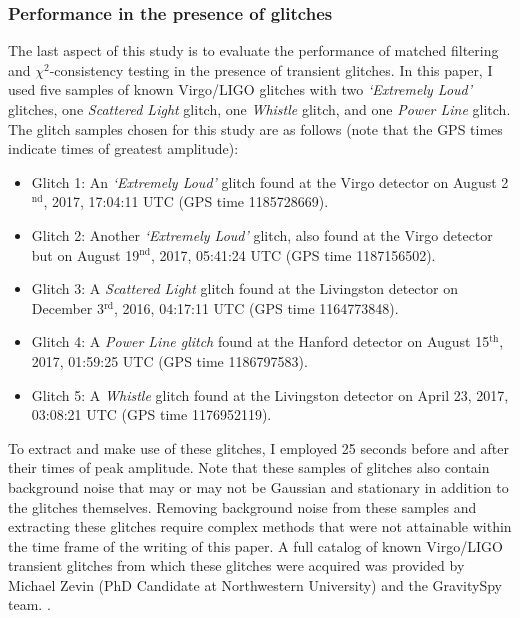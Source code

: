 \documentclass[preprint,
letterpaper,
 amsmath,amssymb,
 aps,
]{revtex4-2}
\begin{document}
\subsubsection{Performance in the presence of glitches}

The last aspect of this study is to evaluate the performance of matched filtering and $\chi^2$-consistency testing in the presence of transient glitches. In this paper, I used five samples of known Virgo/LIGO glitches with two \textit{`Extremely Loud'} glitches, one \textit{Scattered Light} glitch, one \textit{Whistle} glitch, and one \textit{Power Line} glitch. The glitch samples chosen for this study are as follows (note that the GPS times indicate times of greatest amplitude):

\begin{itemize}
\item Glitch 1: An \textit{`Extremely Loud'} glitch found at the Virgo detector on August 2$^{\text{nd}}$, 2017, 17:04:11 UTC (GPS time 1185728669).

\item Glitch 2: Another \textit{`Extremely Loud'} glitch, also found at the Virgo detector but on August 19$^{\text{nd}}$, 2017, 05:41:24 UTC (GPS time 1187156502).

\item Glitch 3: A \textit{Scattered Light} glitch found at the Livingston detector on December 3$^{\text{rd}}$, 2016, 04:17:11 UTC (GPS time 1164773848).

\item Glitch 4: A \textit{Power Line glitch} found at the Hanford detector on August 15$^{\text{th}}$, 2017, 01:59:25 UTC (GPS time 1186797583).

\item Glitch 5: A \textit{Whistle} glitch found at the Livingston detector on April 23, 2017, 03:08:21 UTC (GPS time 1176952119).
\end{itemize}

To extract and make use of these glitches,  I employed 25 seconds before and after their times of peak amplitude. Note that these samples of glitches also contain background noise that may or may not be Gaussian and stationary in addition to the glitches themselves. Removing background noise from these samples and extracting these glitches require complex methods that were not attainable within the time frame of the writing of this paper. A full catalog of known Virgo/LIGO transient glitches from which these glitches were acquired was provided by Michael Zevin (PhD Candidate at Northwestern University) and the GravitySpy team. \cite{gravityspy}. 
\end{document}
